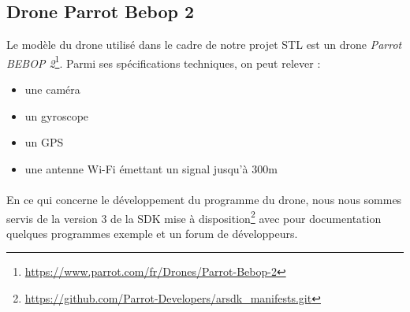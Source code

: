 \subsection{Drone Parrot Bebop 2}

Le modèle du drone utilisé dans le cadre de notre projet STL est un drone \textit{Parrot BEBOP 2}\footnote{\url{https://www.parrot.com/fr/Drones/Parrot-Bebop-2}}. Parmi ses spécifications techniques, on peut relever :
\begin{itemize}
\item une caméra
\item un gyroscope
\item un GPS
\item une antenne  Wi-Fi émettant un signal jusqu'à 300m
\end{itemize}

\paragraph{}
En ce qui concerne le développement du programme du drone, nous nous sommes servis de la version 3 de la SDK mise à disposition\footnote{\url{https://github.com/Parrot-Developers/arsdk_manifests.git}} avec pour documentation quelques programmes exemple et un forum de développeurs.